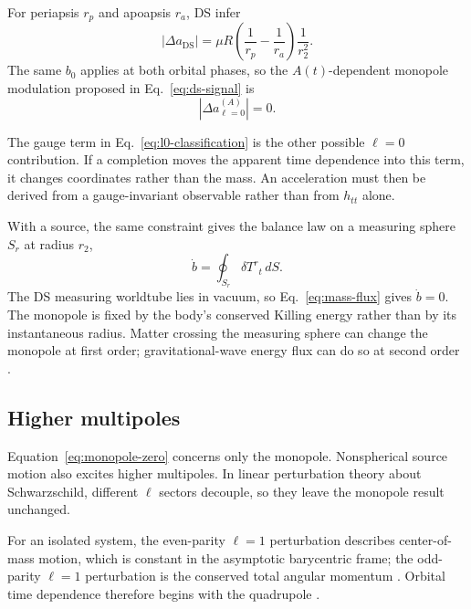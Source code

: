 \documentclass[aps,prd,10pt,onecolumn,nofootinbib,superscriptaddress,floatfix]{revtex4-2}
\begin{document}
For periapsis $r_p$ and apoapsis $r_a$, DS infer
\begin{equation}
  |\Delta a_{\mathrm{DS}}|
  =\mu R\left(\frac{1}{r_p}-\frac{1}{r_a}\right)\frac{1}{r_2^2}.
  \label{eq:ds-signal}
\end{equation}
The same $b_0$ applies at both orbital phases, so the $A(t)$-dependent monopole
modulation proposed in Eq.~\eqref{eq:ds-signal} is
\begin{equation}
  |\Delta a^{(A)}_{\ell=0}|=0.
  \label{eq:monopole-zero}
\end{equation}

The gauge term in Eq.~\eqref{eq:l0-classification} is the other possible
$\ell=0$ contribution.  If a completion moves the apparent time dependence
into this term, it changes coordinates rather than the mass.  An acceleration
must then be derived from a gauge-invariant observable rather than from
$h_{tt}$ alone.

With a source, the same constraint gives the balance law on a measuring sphere
$S_r$ at radius $r_2$,
\begin{equation}
  \dot b=\oint_{S_r}\delta T^{r}{}_{t}\,dS.
  \label{eq:mass-flux}
\end{equation}
The DS measuring worldtube lies in vacuum, so Eq.~\eqref{eq:mass-flux} gives
$\dot b=0$.  The monopole is fixed
by the body's conserved Killing energy rather than by its instantaneous
radius.  Matter crossing the measuring sphere can change the monopole at first
order; gravitational-wave energy flux can do so at second order
\cite{BondiVanderBurgMetzner1962Gravitational,Sachs1962Asymptotic}.

\subsection{Higher multipoles}

Equation~\eqref{eq:monopole-zero} concerns only the monopole.  Nonspherical
source motion also excites higher multipoles.  In linear perturbation theory
about Schwarzschild, different $\ell$ sectors decouple, so they leave the
monopole result unchanged.

For an isolated system, the even-parity $\ell=1$ perturbation describes
center-of-mass motion, which is constant in the asymptotic barycentric frame;
the odd-parity $\ell=1$ perturbation is the conserved total angular momentum
\cite{MartelPoisson2005SchwarzschildPerturbations}.  Orbital time dependence
therefore begins with the quadrupole \cite{Thorne1980Multipole}.
\end{document}
